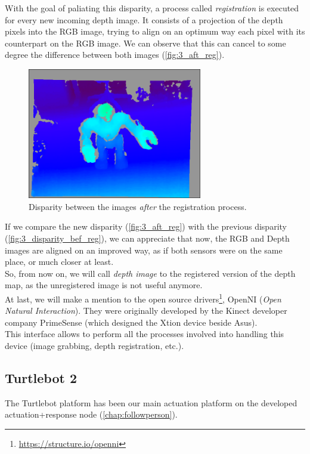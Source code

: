		With the goal of paliating this disparity, a process called \emph{registration} is executed for every new incoming depth image. It consists of a projection of the depth pixels into the RGB image, trying to align on an optimum way each pixel with its counterpart on the RGB image. We can observe that this can cancel to some degree the difference between both images (\autoref{fig:3_aft_reg}).
		
		
		\begin{figure}[h!]
			\centering
			\includegraphics[width=3in]{images/disparity_after}
			\caption{Disparity between the images \emph{after} the registration process.}
			\label{fig:3_aft_reg}
		\end{figure}
		
		If we compare the new disparity (\autoref{fig:3_aft_reg}) with the previous disparity (\autoref{fig:3_disparity_bef_reg}), we can appreciate that now, the RGB and Depth images are aligned on an improved way, as if both sensors were on the same place, or much closer at least.\\
		
		So, from now on, we will call \emph{depth image} to the registered version of the depth map, as the unregistered image is not useful anymore.\\
		
		At last, we will make a mention to the open source drivers\footnote{\url{https://structure.io/openni}}, OpenNI (\emph{Open Natural Interaction}). They were originally developed by the Kinect developer company PrimeSense (which designed the Xtion device beside Asus).\\
		
		This interface allows to perform all the processes involved into handling this device (image grabbing, depth registration, etc.).
		
	\subsection{Turtlebot 2}
		The Turtlebot platform has been our main actuation platform on the developed actuation+response node (\autoref{chap:followperson}).\\
		
